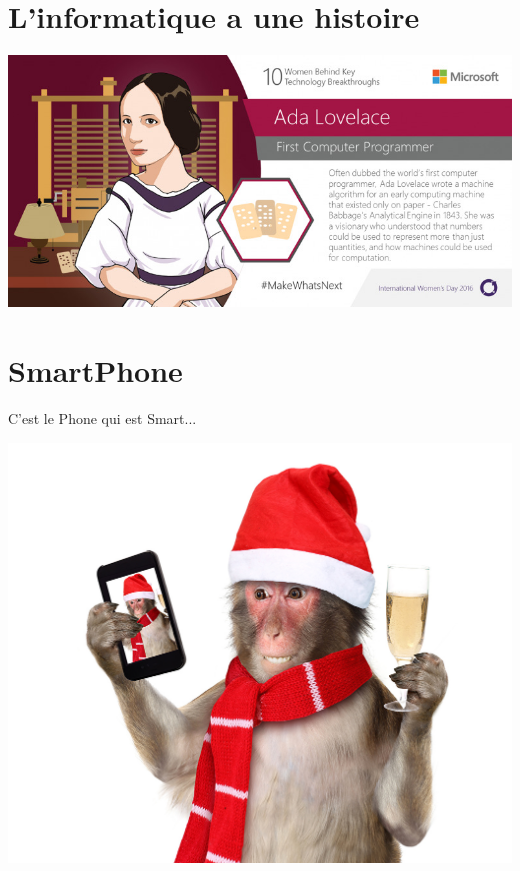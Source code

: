 \documentclass[french,handout]{beamer}
\begin{document}
\section{L'informatique a une histoire}


\begin{frame}
  \begin{center}
\includegraphics[height=.7\textheight]{./ada.jpg}
    
  \end{center}


\end{frame}



\section{SmartPhone}


\begin{frame}

  C'est le Phone qui est Smart...\\

  

\begin{center}
  \includegraphics[height=.6\textheight]{singe}
\end{center}


\end{frame}
\end{document}
